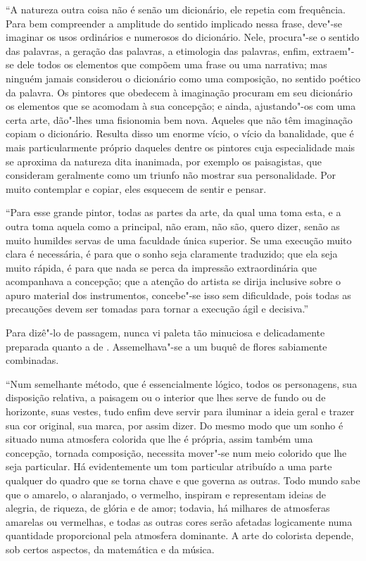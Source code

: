 “A natureza outra coisa não é senão um dicionário, ele repetia com
frequência. Para bem compreender a amplitude do sentido implicado nessa
frase, deve"-se imaginar os usos ordinários e numerosos do dicionário.
Nele, procura"-se o sentido das palavras, a geração das palavras, a
etimologia das palavras, enfim, extraem"-se dele todos os elementos que
compõem uma frase ou uma narrativa; mas ninguém jamais considerou o
dicionário como uma composição, no sentido poético da palavra. Os
pintores que obedecem à imaginação procuram em seu dicionário os
elementos que se acomodam à sua concepção; e ainda, ajustando"-os com
uma certa arte, dão"-lhes uma fisionomia bem nova. Aqueles que não têm
imaginação copiam o dicionário. Resulta disso um enorme vício, o vício
da banalidade, que é mais particularmente próprio daqueles dentre os
pintores cuja especialidade mais se aproxima da natureza dita
inanimada, por exemplo os paisagistas, que consideram geralmente como
um triunfo não mostrar sua personalidade. Por muito contemplar e
copiar, eles esquecem de sentir e pensar.

“Para esse grande pintor, todas as partes da arte, da qual uma toma
esta, e a outra toma aquela como a principal, não eram, não são, quero
dizer, senão as muito humildes servas de uma faculdade única superior.
Se uma execução muito clara é necessária, é para que o sonho seja
claramente traduzido; que ela seja muito rápida, é para que nada se
perca da impressão extraordinária que acompanhava a concepção; que a
atenção do artista se dirija inclusive sobre o apuro material dos
instrumentos, concebe"-se isso sem dificuldade, pois todas as precauções
devem ser tomadas para tornar a execução ágil e decisiva.”

Para dizê"-lo de passagem, nunca vi paleta tão minuciosa e delicadamente
preparada quanto a de . Assemelhava"-se a um buquê de flores
sabiamente combinadas.

“Num semelhante método, que é essencialmente lógico, todos os
personagens, sua disposição relativa, a paisagem ou o interior que lhes
serve de fundo ou de horizonte, suas vestes, tudo enfim deve servir
para iluminar a ideia geral e trazer sua cor original, sua marca, por
assim dizer. Do mesmo modo que um sonho é situado numa atmosfera
colorida que lhe é própria, assim também uma concepção, tornada
composição, necessita mover"-se num meio colorido que lhe seja
particular. Há evidentemente um tom particular atribuído a uma parte
qualquer do quadro que se torna chave e que governa as outras. Todo
mundo sabe que o amarelo, o alaranjado, o vermelho, inspiram e
representam ideias de alegria, de riqueza, de glória e de amor;
todavia, há milhares de atmosferas amarelas ou vermelhas, e todas as
outras cores serão afetadas logicamente numa quantidade proporcional
pela atmosfera dominante. A arte do colorista depende, sob certos
aspectos, da matemática e da música.

